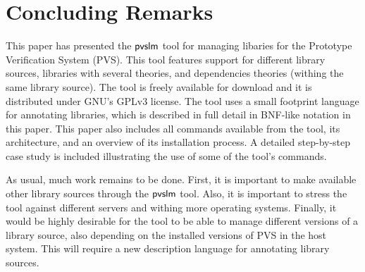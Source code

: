 \section{Concluding Remarks}
\label{sec.concl}

This paper has presented the $\textsf{pvslm}$ tool for managing libaries for
the Prototype Verification System (PVS). This tool features support
for different library sources, libraries with several theories, and
dependencies theories (withing the same library source).  The tool is
freely available for download and it is distributed under GNU's GPLv3
license. The tool uses a small footprint language for annotating
libraries, which is described in full detail in BNF-like notation in
this paper. This paper also includes all commands available from the
tool, its architecture, and an overview of its installation process.
A detailed step-by-step case study is included illustrating the use of
some of the tool's commands.

As usual, much work remains to be done. First, it is important to make
available other library sources through the $\textsf{pvslm}$ tool.  Also, it
is important to stress the tool against different servers and withing
more operating systems. Finally, it would be highly desirable for the
tool to be able to manage different versions of a library source, also
depending on the installed versions of PVS in the host system. This
will require a new description language for annotating library
sources.
